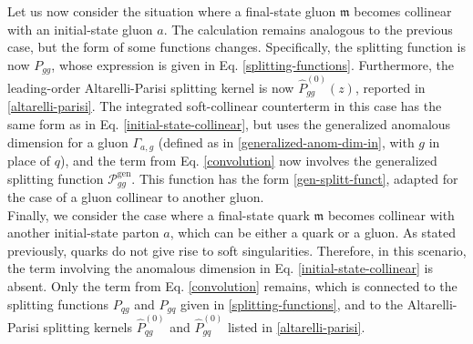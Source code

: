\documentclass[a4paper, 12pt]{book}
\newcommand{\um}{\mathfrak{m}}
\begin{document}
Let us now consider the situation where a final-state gluon $\um$ becomes collinear with an initial-state gluon $a$. The calculation remains analogous to the previous case, but the form of some functions changes. Specifically, the splitting function is now $P_{gg}$, whose expression is given in Eq. \ref{splitting-functions}. Furthermore, the leading-order Altarelli-Parisi splitting kernel is now $\hat{P}_{gg}^{(0)}(z)$, reported in \ref{altarelli-parisi}. The integrated soft-collinear counterterm in this case has the same form as in Eq. \ref{initial-state-collinear}, but uses the generalized anomalous dimension for a gluon $\Gamma_{a,g}$ (defined as in \ref{generalized-anom-dim-in}, with $g$ in place of $q$), and the term from Eq. \ref{convolution} now involves the generalized splitting function $\mathcal{P}_{gg}^{\mathrm{gen}}$. This function has the form \ref{gen-splitt-funct}, adapted for the case of a gluon collinear to another gluon. \\

Finally, we consider the case where a final-state quark $\um$ becomes collinear with another initial-state parton $a$, which can be either a quark or a gluon. As stated previously, quarks do not give rise to soft singularities. Therefore, in this scenario, the term involving the anomalous dimension in Eq. \ref{initial-state-collinear} is absent. Only the term from Eq. \ref{convolution} remains, which is connected to the splitting functions $P_{qg}$ and $P_{gq}$ given in \ref{splitting-functions}, and to the Altarelli-Parisi splitting kernels $\hat{P}_{qg}^{(0)}$ and $\hat{P}_{gq}^{(0)}$ listed in \ref{altarelli-parisi}.
\end{document}
